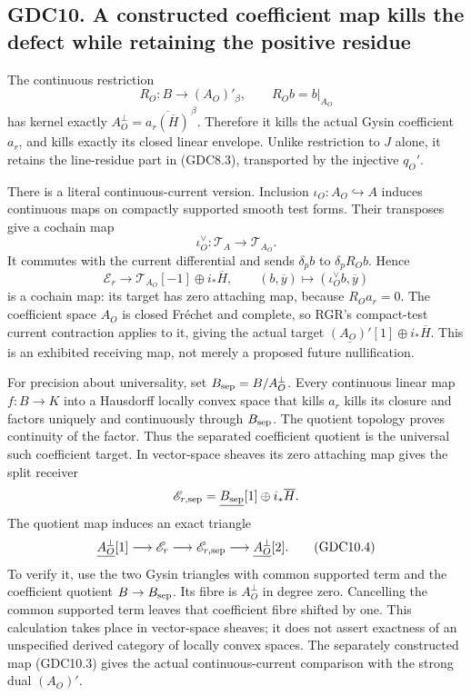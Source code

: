 \subsection{GDC10. A constructed coefficient map kills the defect while
retaining the positive
residue}\label{gdc10.-a-constructed-coefficient-map-kills-the-defect-while-retaining-the-positive-residue}

The continuous restriction \[
R_O:B\longrightarrow(A_O)'_\beta,
\qquad R_Ob=b|_{A_O}
\tag{GDC10.1}
\] has kernel exactly
\(A_O^\perp=\overline{a_r(\overline H)}^{\,\beta}\). Therefore it kills
the actual Gysin coefficient \(a_r\), and kills exactly its closed
linear envelope. Unlike restriction to \(J\) alone, it retains the
line-residue part in (GDC8.3), transported by the injective \(q_O'\).

There is a literal continuous-current version. Inclusion
\(\iota_O:A_O\hookrightarrow A\) induces continuous maps on compactly
supported smooth test forms. Their transposes give a cochain map \[
\iota_O^\vee:\mathscr T_A\longrightarrow\mathscr T_{A_O}.
\tag{GDC10.2}
\] It commutes with the current differential and sends \(\delta_pb\) to
\(\delta_p R_Ob\). Hence \[
\mathscr E_r\longrightarrow
\mathscr T_{A_O}[-1]\oplus i_*\overline H,
\qquad(b,\overline y)\longmapsto(\iota_O^\vee b,\overline y)
\tag{GDC10.3}
\] is a cochain map: its target has zero attaching map, because
\(R_Oa_r=0\). The coefficient space \(A_O\) is closed Fréchet and
complete, so RGR's compact-test current contraction applies to it,
giving the actual target \(\underline{(A_O)'}[1]\oplus i_*\overline H\).
This is an exhibited receiving map, not merely a proposed future
nullification.

For precision about universality, set \(B_{\rm sep}=B/A_O^\perp\). Every
continuous linear map \(f:B\to K\) into a Hausdorff locally convex space
that kills \(a_r\) kills its closure and factors uniquely and
continuously through \(B_{\rm sep}\). The quotient topology proves
continuity of the factor. Thus the separated coefficient quotient is the
universal such coefficient target. In vector-space sheaves its zero
attaching map gives the split receiver \[
\mathscr E_{r,\rm sep}=\underline{B_{\rm sep}}[1]\oplus i_*\overline H.
\] The quotient map induces an exact triangle \[
\underline{A_O^\perp}[1]\longrightarrow\mathscr E_r
\longrightarrow\mathscr E_{r,\rm sep}
\longrightarrow\underline{A_O^\perp}[2].
\tag{GDC10.4}
\] To verify it, use the two Gysin triangles with common supported term
and the coefficient quotient \(B\to B_{\rm sep}\). Its fibre is
\(A_O^\perp\) in degree zero. Cancelling the common supported term
leaves that coefficient fibre shifted by one. This calculation takes
place in vector-space sheaves; it does not assert exactness of an
unspecified derived category of locally convex spaces. The separately
constructed map (GDC10.3) gives the actual continuous-current comparison
with the strong dual \((A_O)'\).

